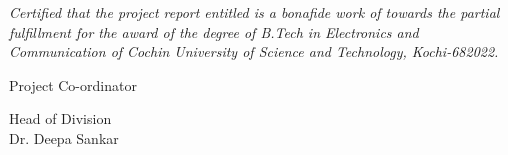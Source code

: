 \vspace*{\fill}
\begin{center}

	\vspace{1cm}
	\par
	\vspace{1cm}
	
	\vspace{.3cm}
	\textit{
		Certified that the project report entitled 
		is a bonafide work of  towards the partial
		fulfillment for the award of the
		degree of B.Tech in Electronics and Communication of Cochin
		University of Science and Technology, Kochi-682022.
	}

	\vspace{3cm}
	\begin{minipage}[t][][r]{.4\linewidth}
		Project Co-ordinator
	\end{minipage}
	\hfill
	\begin{minipage}[t][][l]{.4\linewidth}
		\begin{flushright}
			Head of Division\\
			Dr. Deepa Sankar
		\end{flushright}
	\end{minipage}
\end{center}
\vspace*{\fill}
